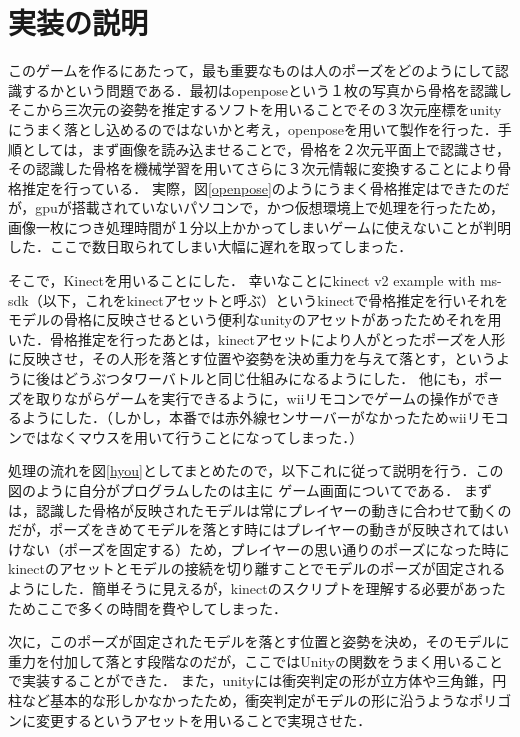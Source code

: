 \documentclass[uplatex,titlepage]{jsarticle}
\begin{document}
\section{実装の説明}
このゲームを作るにあたって，最も重要なものは人のポーズをどのようにして認識するかという問題である．最初はopenpose\cite{openpose}という１枚の写真から骨格を認識しそこから三次元の姿勢を推定するソフトを用いることでその３次元座標をunityにうまく落とし込めるのではないかと考え，openposeを用いて製作を行った．手順としては，まず画像を読み込ませることで，骨格を２次元平面上で認識させ，その認識した骨格を機械学習を用いてさらに３次元情報に変換することにより骨格推定を行っている．
実際，図\ref{openpose}のようにうまく骨格推定はできたのだが，gpuが搭載されていないパソコンで，かつ仮想環境上で処理を行ったため，画像一枚につき処理時間が１分以上かかってしまいゲームに使えないことが判明した．ここで数日取られてしまい大幅に遅れを取ってしまった．

そこで，Kinectを用いることにした．
幸いなことにkinect v2 example with ms-sdk\cite{kinect}（以下，これをkinectアセットと呼ぶ）というkinectで骨格推定を行いそれをモデルの骨格に反映させるという便利なunityのアセットがあったためそれを用いた．骨格推定を行ったあとは，kinectアセットにより人がとったポーズを人形に反映させ，その人形を落とす位置や姿勢を決め重力を与えて落とす，というように後はどうぶつタワーバトルと同じ仕組みになるようにした．
他にも，ポーズを取りながらゲームを実行できるように，wiiリモコンでゲームの操作ができるようにした．（しかし，本番では赤外線センサーバーがなかったためwiiリモコンではなくマウスを用いて行うことになってしまった．）

処理の流れを図\ref{hyou}としてまとめたので，以下これに従って説明を行う．この図のように自分がプログラムしたのは主に
ゲーム画面についてである．
まずは，認識した骨格が反映されたモデルは常にプレイヤーの動きに合わせて動くのだが，ポーズをきめてモデルを落とす時にはプレイヤーの動きが反映されてはいけない（ポーズを固定する）ため，プレイヤーの思い通りのポーズになった時にkinectのアセットとモデルの接続を切り離すことでモデルのポーズが固定されるようにした．簡単そうに見えるが，kinectのスクリプトを理解する必要があったためここで多くの時間を費やしてしまった．

次に，このポーズが固定されたモデルを落とす位置と姿勢を決め，そのモデルに重力を付加して落とす段階なのだが，ここではUnityの関数をうまく用いることで実装することができた．
また，unityには衝突判定の形が立方体や三角錐，円柱など基本的な形しかなかったため，衝突判定がモデルの形に沿うようなポリゴンに変更するというアセットを用いることで実現させた．
\end{document}
